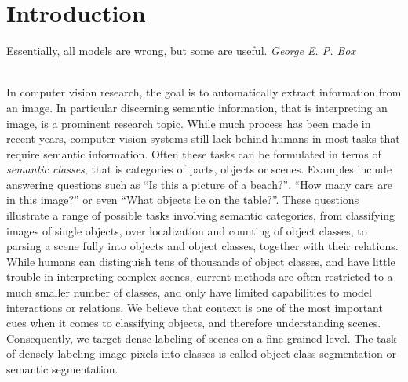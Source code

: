 \chapter{Introduction}
\vspace{1cm}
\hfill%
\begin{minipage}{.4\linewidth}
Essentially, all models are wrong, but some are useful. 
\flushright%
\emph{George E. P. Box}

\end{minipage}%
\\[2cm]
In computer vision research, the goal is to automatically extract information from an image.
In particular discerning semantic information, that is interpreting an image, is a prominent
research topic.
While much process has been made in recent years, computer vision systems still lack behind
humans in most tasks that require semantic information. Often these tasks can be formulated
in terms of \emph{semantic classes}, that is categories of parts, objects or scenes.
Examples include answering questions such as ``Is this a picture of a beach?'', ``How many
cars are in this image?'' or even ``What objects lie on the table?''.
These questions illustrate a range of possible tasks involving semantic categories,
from classifying images of single objects, over localization and counting of object classes,
to parsing a scene fully into objects and object classes, together with their relations.
%
While humans can distinguish tens of thousands of object classes, and have little trouble
in interpreting complex scenes, current methods are often restricted to a much smaller number
of classes, and only have limited capabilities to model interactions or relations.
We believe that context is one of the most important cues when it comes to classifying objects,
and therefore understanding scenes. Consequently, we target dense labeling of scenes on a fine-grained level.
The task of densely labeling image pixels into classes is called object class segmentation
or semantic segmentation.
\pagebreak

